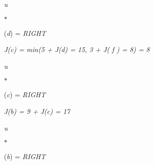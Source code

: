 \documentclass[12pt,twoside]{article}
\begin{document}
\begin{adjustwidth}{2.36in}{0.0in}
\begin{FlushLeft}
{\fontsize{10pt}{12.0pt}\selectfont \textit{u}{\fontsize{7pt}{8.4pt}\selectfont $\ast$  {\fontsize{10pt}{12.0pt}\selectfont (\textit{d}) = \textit{RIGHT}\par}\par}\par}
\end{FlushLeft}\par

\end{adjustwidth}


\vspace{\baselineskip}
\begin{adjustwidth}{2.46in}{0.0in}
{\fontsize{10pt}{12.0pt}\selectfont \textit{J(c) = min(5 + J(d) = 15, 3 + J( f ) = 8) = 8}\par}\par

\end{adjustwidth}

\begin{adjustwidth}{2.37in}{0.0in}
\begin{FlushLeft}
{\fontsize{10pt}{12.0pt}\selectfont \textit{u}{\fontsize{7pt}{8.4pt}\selectfont $\ast$  {\fontsize{10pt}{12.0pt}\selectfont (\textit{c}) = \textit{RIGHT}\par}\par}\par}
\end{FlushLeft}\par

\end{adjustwidth}


\vspace{\baselineskip}
\begin{adjustwidth}{0.07in}{1.09in}
{\fontsize{10pt}{12.0pt}\selectfont \textit{J(b) = 9 + J(c) = 17}\par}\par

\end{adjustwidth}

\begin{adjustwidth}{2.36in}{0.0in}
\begin{FlushLeft}
{\fontsize{10pt}{12.0pt}\selectfont \textit{u}{\fontsize{7pt}{8.4pt}\selectfont $\ast$  {\fontsize{10pt}{12.0pt}\selectfont (\textit{b}) = \textit{RIGHT}\par}\par}\par}
\end{FlushLeft}\par

\end{adjustwidth}
\end{document}
